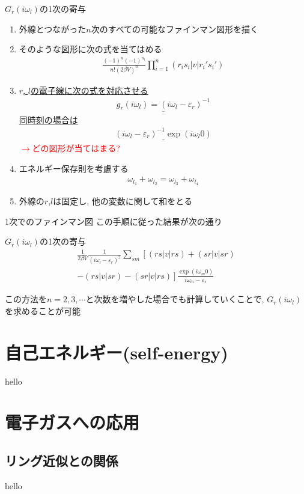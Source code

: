 \documentclass[dvipdfmx,10pt]{beamer}
\begin{document}
\begin{frame}{$G_r(i\omega_l)$の1次の寄与}
    \footnotesize
    \begin{enumerate}
        \item 外線とつながった$n$次のすべての可能なファインマン図形を描く
        \item そのような図形に次の式を当てはめる
        \begin{align*}
            \frac{(-1)^n(-1)^{n_l}}{n!(2\beta V)^n}\prod_{i=1}^{n}\left(r_is_i|v|r_i's_i'\right)
        \end{align*}
        \item \underline{$r$, $l$の電子線に次の式を対応させる}
        \begin{align*}
            \underline{g_r(i\omega_l) = (i\omega_l-\varepsilon_r)^{-1}}
        \end{align*}
        \underline{同時刻の場合は}
        \begin{align*}
            \underline{(i\omega_l-\varepsilon_r)^{-1}\exp(i\omega_l0)}
        \end{align*}
        \textcolor{red}{$\rightarrow$どの図形が当てはまる?}
        \item エネルギー保存則を考慮する
        \begin{align*}
            \omega_{l_1} + \omega_{l_2} = \omega_{l_3} + \omega_{l_4}
        \end{align*}
        \item 外線の$r$,$l$は固定し, 他の変数に関して和をとる
    \end{enumerate}
    \normalsize
\end{frame}

\begin{frame}{1次でのファインマン図}
    この手順に従った結果が次の通り
    \begin{block}{$G_r(i\omega_l)$の1次の寄与}
        \begin{align*}
            \frac{1}{2\beta V}\frac{1}{(i\omega_l-\varepsilon_r)^2}\sum_{sm}\left[(rs|v|rs)+(sr|v|sr)\right.\\
            \left.-(rs|v|sr)-(sr|v|rs)\right]\frac{\exp(i\omega_m 0)}{i\omega_m-\varepsilon_s} \tag{47}
        \end{align*}
    \end{block}
    この方法を$n=2,3,\cdots$と次数を増やした場合でも計算していくことで, $G_r(i\omega_l)$を求めることが可能
\end{frame}


\section{自己エネルギー(self-energy)}
\begin{frame}
    hello
\end{frame}

\section{電子ガスへの応用}
\subsection{リング近似との関係}
\begin{frame}
    hello
\end{frame}
\end{document}
